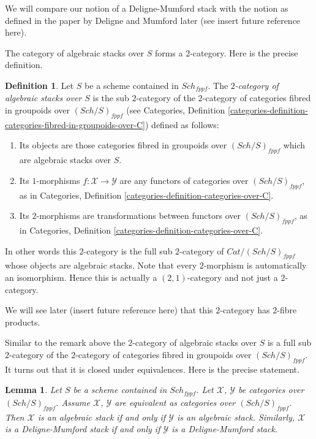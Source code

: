 \documentclass{stacks-project}
\theoremstyle{plain}
\newtheorem{lemma}[subsection]{Lemma}
\theoremstyle{definition}
\newtheorem{definition}[subsection]{Definition}
\theoremstyle{remark}
\numberwithin{equation}{subsection}
\def\Sch{\mathit{Sch}}
\begin{document}
\noindent
We will compare our notion of a Deligne-Mumford stack with
the notion as defined in the paper by Deligne and Mumford later
(see insert future reference here).

\medskip\noindent
The category of algebraic stacks over $S$ forms a $2$-category.
Here is the precise definition.

\begin{definition}
\label{definition-morphism-algebraic-stacks}
Let $S$ be a scheme contained in $\Sch_{fppf}$.
The {\it $2$-category of algebraic stacks over $S$} is the
sub $2$-category of the $2$-category of categories fibred in
groupoids over $(\Sch/S)_{fppf}$ (see
Categories,
Definition \ref{categories-definition-categories-fibred-in-groupoids-over-C})
defined as follows:
\begin{enumerate}
\item Its objects are those categories fibred in groupoids
over $(\Sch/S)_{fppf}$ which are algebraic stacks over $S$.
\item Its $1$-morphisms $f : \mathcal{X} \to \mathcal{Y}$ are
any functors of categories over $(\Sch/S)_{fppf}$, as in
Categories, Definition \ref{categories-definition-categories-over-C}.
\item Its $2$-morphisms are transformations between functors
over $(\Sch/S)_{fppf}$, as in
Categories, Definition \ref{categories-definition-categories-over-C}.
\end{enumerate}
\end{definition}

\noindent
In other words this $2$-category is the full sub $2$-category of
$\textit{Cat}/(\Sch/S)_{fppf}$ whose objects are algebraic stacks.
Note that every $2$-morphism is automatically an isomorphism.
Hence this is actually a $(2, 1)$-category and not just a $2$-category.

\medskip\noindent
We will see later (insert future reference here) that this $2$-category
has $2$-fibre products.

\medskip\noindent
Similar to the remark above the $2$-category of algebraic stacks over $S$ is a
full sub $2$-category of the $2$-category of categories fibred in groupoids
over $(\Sch/S)_{fppf}$. It turns out that it is closed under
equivalences. Here is the precise statement.

\begin{lemma}
\label{lemma-equivalent}
Let $S$ be a scheme contained in $\Sch_{fppf}$.
Let $\mathcal{X}$, $\mathcal{Y}$ be categories over $(\Sch/S)_{fppf}$.
Assume $\mathcal{X}$, $\mathcal{Y}$ are equivalent as categories over
$(\Sch/S)_{fppf}$. Then $\mathcal{X}$ is an algebraic stack if and
only if $\mathcal{Y}$ is an algebraic stack. Similarly, $\mathcal{X}$
is a Deligne-Mumford stack if and only if $\mathcal{Y}$ is a Deligne-Mumford
stack.
\end{lemma}
\end{document}
